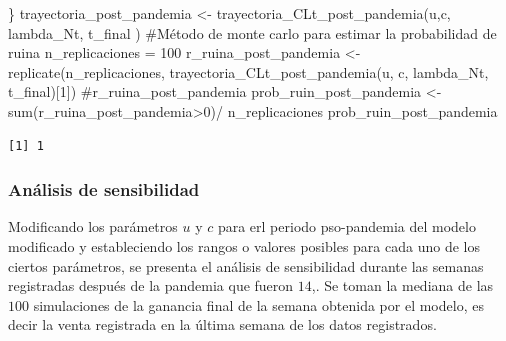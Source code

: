 \documentclass[
  us-letterpaper,
]{scrreprt}
\newenvironment{Shaded}{\begin{snugshade}}{\end{snugshade}}
\newcommand{\CommentTok}[1]{\textcolor[rgb]{0.37,0.37,0.37}{#1}}
\newcommand{\DecValTok}[1]{\textcolor[rgb]{0.68,0.00,0.00}{#1}}
\newcommand{\FunctionTok}[1]{\textcolor[rgb]{0.28,0.35,0.67}{#1}}
\newcommand{\NormalTok}[1]{\textcolor[rgb]{0.00,0.23,0.31}{#1}}
\newcommand{\OtherTok}[1]{\textcolor[rgb]{0.00,0.23,0.31}{#1}}
\newcommand{\SpecialCharTok}[1]{\textcolor[rgb]{0.37,0.37,0.37}{#1}}
\theoremstyle{definition}
\theoremstyle{plain}
\theoremstyle{plain}
\theoremstyle{remark}
\begin{document}
\begin{Shaded}
\begin{Highlighting}[]
\NormalTok{\}}
\NormalTok{trayectoria\_post\_pandemia }\OtherTok{\textless{}{-}} \FunctionTok{trayectoria\_CLt\_post\_pandemia}\NormalTok{(u,c,}
\NormalTok{                                            lambda\_Nt, t\_final )}
\CommentTok{\#Método de monte carlo para estimar la probabilidad de ruina}
\NormalTok{n\_replicaciones }\OtherTok{=} \DecValTok{100}
\NormalTok{r\_ruina\_post\_pandemia }\OtherTok{\textless{}{-}} \FunctionTok{replicate}\NormalTok{(n\_replicaciones,}
                          \FunctionTok{trayectoria\_CLt\_post\_pandemia}\NormalTok{(u, c, }
\NormalTok{                                          lambda\_Nt, t\_final)[}\DecValTok{1}\NormalTok{])}
\CommentTok{\#r\_ruina\_post\_pandemia}
\NormalTok{prob\_ruin\_post\_pandemia }\OtherTok{\textless{}{-}} \FunctionTok{sum}\NormalTok{(r\_ruina\_post\_pandemia}\SpecialCharTok{\textgreater{}}\DecValTok{0}\NormalTok{)}\SpecialCharTok{/}
\NormalTok{n\_replicaciones}
\NormalTok{prob\_ruin\_post\_pandemia}
\end{Highlighting}
\end{Shaded}

\begin{verbatim}
[1] 1
\end{verbatim}

\subsubsection{Análisis de
sensibilidad}\label{anuxe1lisis-de-sensibilidad-1}

Modificando los parámetros \(u\) y \(c\) para erl periodo pso-pandemia
del modelo modificado y estableciendo los rangos o valores posibles para
cada uno de los ciertos parámetros, se presenta el análisis de
sensibilidad durante las semanas registradas después de la pandemia que
fueron \(14\),. Se toman la mediana de las \(100\) simulaciones de la
ganancia final de la semana obtenida por el modelo, es decir la venta
registrada en la última semana de los datos registrados.
\end{document}
